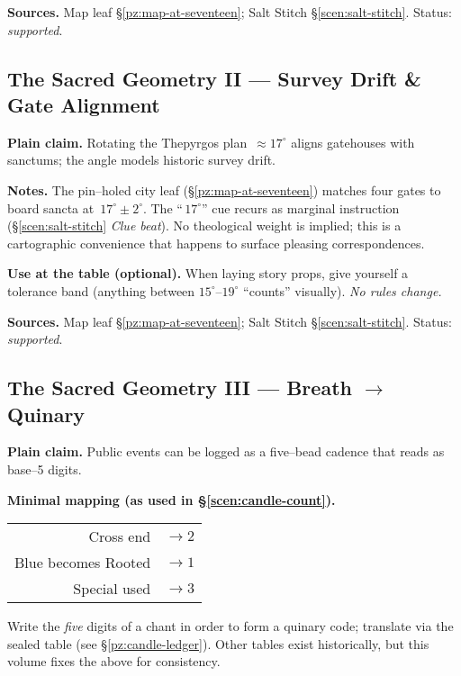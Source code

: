\documentclass[11pt]{article}
\begin{document}
\begin{itemize}
\medskip
\noindent\textbf{Sources.} Map leaf \S\ref{pz:map-at-seventeen}; Salt Stitch \S\ref{scen:salt-stitch}. Status: \emph{supported}.

\subsection{The Sacred Geometry II — Survey Drift \& Gate Alignment}
\label{konmetry:seventeen}
{}

\noindent\textbf{Plain claim.} Rotating the Thepyrgos plan \(\,\approx17^\circ\) aligns gatehouses with sanctums; the angle models historic survey drift.

\medskip
\noindent\textbf{Notes.} The pin–holed city leaf (\S\ref{pz:map-at-seventeen}) matches four gates to board sancta at \(\,17^\circ\pm2^\circ\). The “\(\,17^\circ\)” cue recurs as marginal instruction (\S\ref{scen:salt-stitch} \emph{Clue beat}). No theological weight is implied; this is a cartographic convenience that happens to surface pleasing correspondences.

\medskip
\noindent\textbf{Use at the table (optional).} When laying story props, give yourself a tolerance band (anything between \(15^\circ\)–\(19^\circ\) “counts” visually). \emph{No rules change.}

\medskip
\noindent\textbf{Sources.} Map leaf \S\ref{pz:map-at-seventeen}; Salt Stitch \S\ref{scen:salt-stitch}. Status: \emph{supported}.

\subsection{The Sacred Geometry III — Breath \(\rightarrow\) Quinary}
\label{konmetry:breath-quinary}
{}

\noindent\textbf{Plain claim.} Public events can be logged as a five–bead cadence that reads as base–5 digits.

\medskip
\noindent\textbf{Minimal mapping (as used in \S\ref{scen:candle-count}).}
\begin{center}
\begin{tabular}{rl}
Cross end & \(\rightarrow 2\) \\
Blue becomes Rooted & \(\rightarrow 1\) \\
Special used & \(\rightarrow 3\)
\end{tabular}
\end{center}
Write the \emph{five} digits of a chant in order to form a quinary code; translate via the sealed table (see \S\ref{pz:candle-ledger}). Other tables exist historically, but this volume fixes the above for consistency.


\end{itemize}
\end{document}
